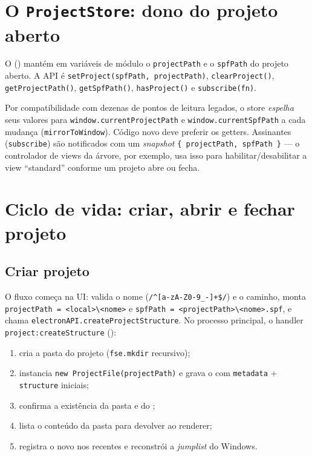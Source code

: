 \section{O \texttt{ProjectStore}: dono do projeto aberto}

O  () mantém em variáveis
de módulo o \lstinline|projectPath| e o \lstinline|spfPath| do projeto aberto.
A API é \lstinline|setProject(spfPath, projectPath)|, \lstinline|clearProject()|,
\lstinline|getProjectPath()|, \lstinline|getSpfPath()|, \lstinline|hasProject()|
e \lstinline|subscribe(fn)|.

Por compatibilidade com dezenas de pontos de leitura legados, o store
\emph{espelha} seus valores para \lstinline|window.currentProjectPath| e
\lstinline|window.currentSpfPath| a cada mudança (\lstinline|mirrorToWindow|).
Código novo deve preferir os getters. Assinantes (\lstinline|subscribe|) são
notificados com um \emph{snapshot} \lstinline|{ projectPath, spfPath }| — o
controlador de views da árvore, por exemplo, usa isso para habilitar/desabilitar
a view \enquote{standard} conforme um projeto abre ou fecha.

\section{Ciclo de vida: criar, abrir e fechar projeto}

\subsection{Criar projeto}

O fluxo começa na UI:  valida o nome
(\lstinline|/^[a-zA-Z0-9_-]+$/|) e o caminho, monta
\lstinline|projectPath = <local>\<nome>| e
\lstinline|spfPath = <projectPath>\<nome>.spf|, e chama
\lstinline|electronAPI.createProjectStructure|. No processo principal, o handler
\lstinline|project:createStructure| ():

\begin{enumerate}[leftmargin=1.8em]
  \item cria a pasta do projeto (\lstinline|fse.mkdir| recursivo);
  \item instancia \lstinline|new ProjectFile(projectPath)| e grava o
     com \lstinline|metadata| + \lstinline|structure| iniciais;
  \item confirma a existência da pasta e do ;
  \item lista o conteúdo da pasta para devolver ao renderer;
  \item registra o novo  nos recentes e reconstrói a \emph{jumplist}
    do Windows.
\end{enumerate}

